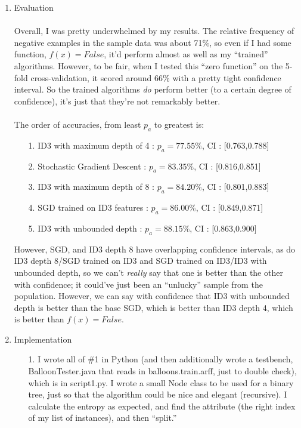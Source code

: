\begin{enumerate}
\item Evaluation\\\\
      Overall, I was pretty underwhelmed by my results. The relative frequency of negative examples in the sample data was about 71\%, so even if I had some function, $f(x) = False$, it'd perform almost as well as my ``trained'' algorithms. However, to be fair, when I tested this ``zero function'' on the 5-fold cross-validation, it scored around 66\% with a pretty tight confidence interval. So the trained algorithms \textit{do} perform better (to a certain degree of confidence), it's just that they're not remarkably better.\\\\
      The order of accuracies, from least $p_a$ to greatest is:\\
      \begin{enumerate}
        \item[1.] 
                  ID3 with maximum depth of 4 : $p_a = 77.55\%$, CI : [0.763,0.788]
        \item[2.]
                  Stochastic Gradient Descent : $p_a = 83.35\%$, CI : [0.816,0.851]        
        \item[3.]
                  ID3 with maximum depth of 8 : $p_a = 84.20\%$, CI : [0.801,0.883]
        \item[4.]
                  SGD trained on ID3 features : $p_a = 86.00\%$, CI : [0.849,0.871]
        \item[5.]
                  ID3 with unbounded depth : $p_a = 88.15\%$, CI : [0.863,0.900]
      \end{enumerate}

      However, SGD, and ID3 depth 8 have overlapping confidence intervals, as do ID3 depth 8/SGD trained on ID3 and SGD trained on ID3/ID3 with unbounded depth, so we can't \textit{really} say that one is better than the other with confidence; it could've just been an ``unlucky'' sample from the population. However, we can say with confidence that ID3 with unbounded depth is better than the base SGD, which is better than ID3 depth 4, which is better than $f(x) = False$.\\

\item Implementation
      \begin{enumerate}
        \item[1.]
                I wrote all of \#1 in Python (and then additionally wrote a testbench, BalloonTester.java that reads in balloons.train.arff, just to double check), which is in script1.py. I wrote a small Node class to be used for a binary tree, just so that the algorithm could be nice and elegant (recursive). I calculate the entropy as expected, and find the attribute (the right index of my list of instances), and then ``split.''


\end{enumerate}
\end{enumerate}
